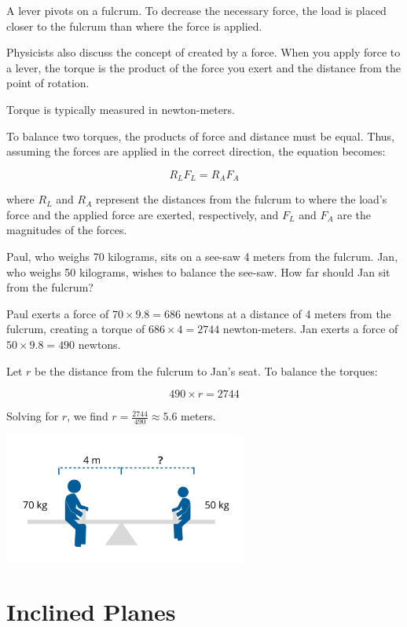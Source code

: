 A lever pivots on a fulcrum. To decrease the necessary force, the load is placed closer to the fulcrum than where the force is applied.

Physicists also discuss the concept of  created by a force. When you apply force to a lever, the torque is the product of the force you exert and the distance from the point of rotation.

Torque is typically measured in newton-meters.

To balance two torques, the products of force and distance must be equal. Thus, assuming the forces are applied in the correct direction, the equation becomes:

\[
R_L F_L = R_A F_A
\]

where \( R_L \) and \( R_A \) represent the distances from the fulcrum to where the load’s force and the applied force are exerted, respectively, and \( F_L \) and \( F_A \) are the magnitudes of the forces.

\begin{Exercise}[title={Lever}, label=lever]
Paul, who weighs 70 kilograms, sits on a see-saw 4 meters from the fulcrum. Jan, who weighs 50 kilograms, wishes to balance the see-saw. How far should Jan sit from the fulcrum?
\end{Exercise}
\begin{Answer}[ref=lever]
Paul exerts a force of \( 70 \times 9.8 = 686 \) newtons at a distance of 4 meters from the fulcrum, creating a torque of \( 686 \times 4 = 2744 \) newton-meters. Jan exerts a force of \( 50 \times 9.8 = 490 \) newtons.

Let \( r \) be the distance from the fulcrum to Jan's seat. To balance the torques:

\[
490 \times r = 2744
\]

Solving for \( r \), we find \( r = \frac{2744}{490} \approx 5.6 \) meters.
\end{Answer}

\includegraphics[width=0.6\textwidth]{seesaw.png}

\section{Inclined Planes}

